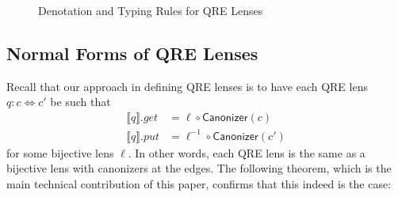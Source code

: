 \documentclass[acmsmall,review,anonymous]{acmart}\settopmatter{printfolios=true,printccs=false,printacmref=false}
\newcommand{\kw}[1]{\ensuremath{\mathsf{#1}}}
\newcommand{\canonizer}{\ensuremath{\kw{Canonizer}}}
\begin{document}
\begin{figure}[ht]
\caption{Denotation and Typing Rules for QRE Lenses}
\label{fig:qlenssemantics}
\end{figure}

\subsection{Normal Forms of QRE Lenses}
Recall that our approach in defining QRE lenses is to have each QRE lens $q: c
\Leftrightarrow c'$ be such that
\begin{align*}
\llbracket q \rrbracket.get &= \ell \circ \canonizer(c)\\
\llbracket q \rrbracket.put &= \ell^{-1} \circ
\canonizer(c')
\end{align*}
for some bijective lens $\ell$. In other words, each QRE lens is the same as a
bijective lens with canonizers at the edges. The following theorem,
which is the main technical contribution of this paper, confirms that this
indeed is the case:
\end{document}
